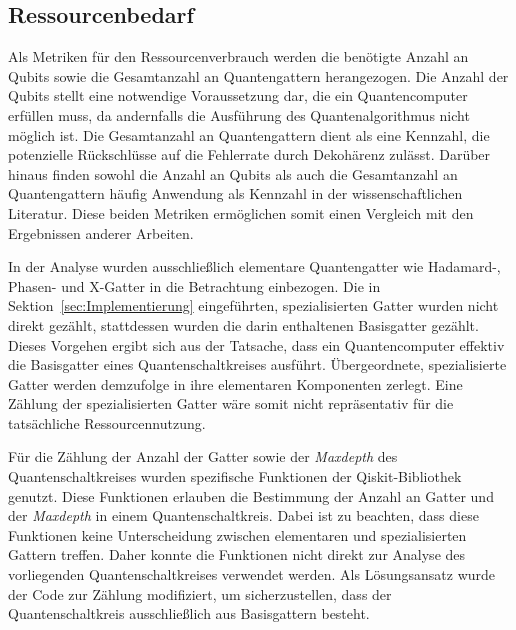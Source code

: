 \subsection*{Ressourcenbedarf}
Als Metriken für den Ressourcenverbrauch werden die benötigte Anzahl an Qubits sowie die Gesamtanzahl an Quantengattern herangezogen. 
Die Anzahl der Qubits stellt eine notwendige Voraussetzung dar, 
die ein Quantencomputer erfüllen muss, da andernfalls die Ausführung des Quantenalgorithmus nicht möglich ist. 
Die Gesamtanzahl an Quantengattern dient als eine Kennzahl, 
die potenzielle Rückschlüsse auf die Fehlerrate durch Dekohärenz zulässt. 
Darüber hinaus finden sowohl die Anzahl an Qubits als auch die Gesamtanzahl an Quantengattern häufig Anwendung als Kennzahl in der wissenschaftlichen Literatur. 
Diese beiden Metriken ermöglichen somit einen Vergleich mit den Ergebnissen anderer Arbeiten.

In der Analyse wurden ausschließlich elementare Quantengatter wie Hadamard-, Phasen- und X-Gatter in die Betrachtung einbezogen. 
Die in Sektion~\ref{sec:Implementierung} eingeführten, spezialisierten Gatter wurden nicht direkt gezählt, 
stattdessen wurden die darin enthaltenen Basisgatter gezählt. 
Dieses Vorgehen ergibt sich aus der Tatsache, dass ein Quantencomputer effektiv die Basisgatter eines Quantenschaltkreises ausführt. 
Übergeordnete, spezialisierte Gatter werden demzufolge in ihre elementaren Komponenten zerlegt. 
Eine Zählung der spezialisierten Gatter wäre somit nicht repräsentativ für die tatsächliche Ressourcennutzung.

Für die Zählung der Anzahl der Gatter sowie der \textit{Maxdepth} des Quantenschaltkreises wurden spezifische Funktionen der Qiskit-Bibliothek genutzt. 
Diese Funktionen erlauben die Bestimmung der Anzahl an Gatter und der \textit{Maxdepth} in einem Quantenschaltkreis.
Dabei ist zu beachten, dass diese Funktionen keine Unterscheidung zwischen elementaren und spezialisierten Gattern treffen.
Daher konnte die Funktionen nicht direkt zur Analyse des vorliegenden Quantenschaltkreises verwendet werden. 
Als Lösungsansatz wurde der Code zur Zählung modifiziert, um sicherzustellen, dass der Quantenschaltkreis ausschließlich aus Basisgattern besteht.

